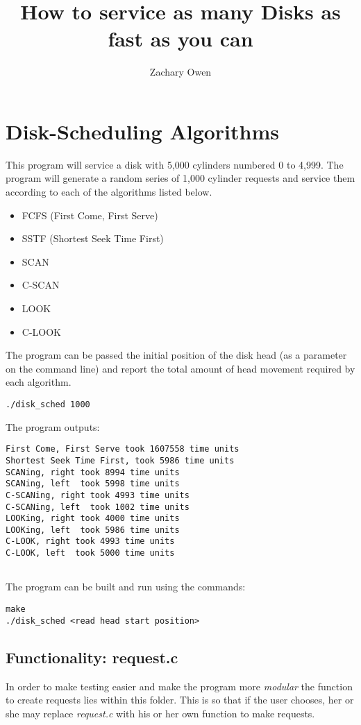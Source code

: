 \documentclass[11pt]{article}
\title{\textbf{How to service as many Disks as fast as you can}}
\author{Zachary Owen}
\date{}
\begin{document}
\maketitle

\section{Disk-Scheduling Algorithms}

This program will service a disk with 5,000 cylinders numbered 0 to 4,999.  The program will generate a random series of 1,000 cylinder requests and service them according to each of the algorithms listed below.  
\begin{itemize}
\item FCFS (First Come, First Serve)
\item SSTF (Shortest Seek Time First)
\item SCAN
\item C-SCAN
\item LOOK
\item C-LOOK
\end{itemize}
 The program can be passed the initial position of the disk head (as a parameter on the command line) and report the total amount of head movement required by each algorithm.

\begin{verbatim}
./disk_sched 1000
\end{verbatim}
 The program outputs: 
 \begin{verbatim}
First Come, First Serve took 1607558 time units
Shortest Seek Time First, took 5986 time units
SCANing, right took 8994 time units
SCANing, left  took 5998 time units
C-SCANing, right took 4993 time units
C-SCANing, left  took 1002 time units
LOOKing, right took 4000 time units
LOOKing, left  took 5986 time units
C-LOOK, right took 4993 time units
C-LOOK, left  took 5000 time units
 
 \end{verbatim}
 The program can be built and run using the commands: 
 \begin{verbatim}
make
./disk_sched <read head start position>
\end{verbatim}

\subsection{Functionality: request.c}

In order to make testing easier and make the program more \textit{modular} the function to create requests lies within this folder. This is so that if the user chooses, her or she may replace \textit{request.c} with his or her own function to make requests.
\end{document}

